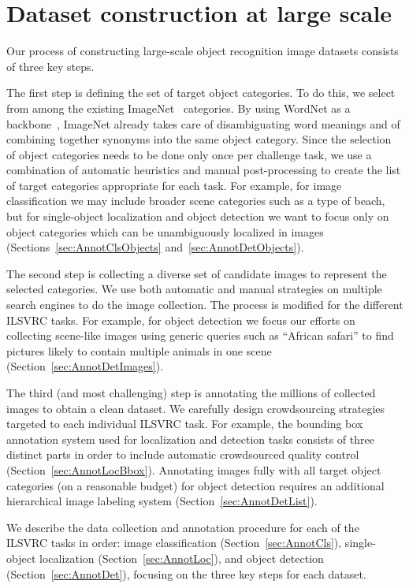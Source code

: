 


\section{Dataset construction at large scale}
\label{sec:Annot}

Our process of constructing large-scale object recognition image datasets consists of three key steps.

The first step is defining the set of target object categories.  To do this, we select from among the existing ImageNet~\citep{ImageNet} categories. By using WordNet as a backbone~\citep{WordNet}, ImageNet already takes care of disambiguating word meanings and of combining
together synonyms into the same object category. Since the selection of object categories needs to be done only
once per challenge task, we use a combination of automatic heuristics and manual post-processing to create the list of target
categories appropriate for each task. For example, for image classification we may include broader scene categories such as a type of beach,
but for single-object localization and object detection we want to focus only on object categories which can be unambiguously localized in images (Sections~\ref{sec:AnnotClsObjects} and~\ref{sec:AnnotDetObjects}).

The second step is collecting a diverse set of candidate images to represent the selected categories. We use both automatic and manual strategies on multiple search engines to do the image collection. The process is modified for the different ILSVRC tasks.
For example, for object detection we focus our efforts on collecting scene-like images using generic queries such as ``African safari'' to find pictures likely to contain multiple animals in one scene (Section~\ref{sec:AnnotDetImages}). 

The third (and most challenging) step is annotating the millions of collected images to obtain a clean dataset.
We carefully design crowdsourcing strategies targeted to each individual ILSVRC task. For example, the bounding box annotation system used for localization and detection tasks consists  of three distinct parts in order to include automatic crowdsourced quality control (Section~\ref{sec:AnnotLocBbox}).  Annotating images fully with all target object categories (on a reasonable budget) for object detection  requires an additional hierarchical image labeling system (Section~\ref{sec:AnnotDetList}).

We  describe the data collection and annotation procedure for each of the ILSVRC tasks in order: image classification (Section~\ref{sec:AnnotCls}), single-object localization (Section~\ref{sec:AnnotLoc}), and object detection (Section~\ref{sec:AnnotDet}), focusing on the three key steps for each dataset.

